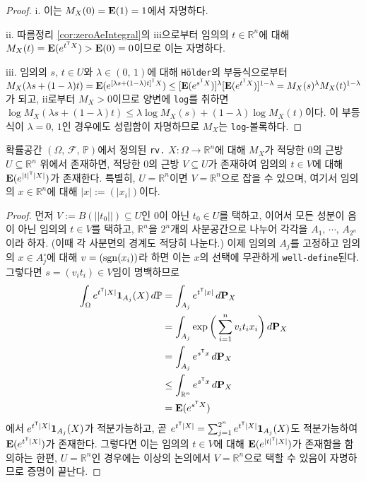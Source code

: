 \begin{proof}
    i. 이는 $M_X(0)=\mathbf{E}(1)=1$에서 자명하다.

    ii. 따름정리 \ref{cor:zeroAeIntegral}의 iii으로부터 임의의 $t\in\mathbb{R}^n$에 대해 $M_X(t)=\mathbf{E}(e^{t^{\mathsf{T}} X})>\mathbf{E}(0)=0$이므로 이는 자명하다.

    iii. 임의의 $s,\,t\in U$와 $\lambda\in(0,\,1)$에 대해 \texttt{H\"older}의 부등식으로부터 $M_X(\lambda s+(1-\lambda)t)=\mathbf{E}(e^{[\lambda s+(1-\lambda)t]^{\mathsf{T}} X})\leq[\mathbf{E}(e^{s^{\mathsf{T}} X})]^\lambda[\mathbf{E}(e^{t^{\mathsf{T}} X})]^{1-\lambda}=M_X(s)^\lambda M_X(t)^{1-\lambda}$가 되고, ii로부터 $M_X>0$이므로 양변에 \texttt{log}를 취하면 $\log M_X(\lambda s+(1-\lambda)t)\leq\lambda\log M_X(s)+(1-\lambda)\log M_X(t)$이다. 이 부등식이 $\lambda=0,\,1$인 경우에도 성립함이 자명하므로 $M_X$는 \texttt{log}-볼록하다.
\end{proof}

\begin{lemma}
    확률공간 $(\Omega,\,\mathcal{F},\,\mathbb{P})$에서 정의된 \texttt{rv.} $X:\Omega\to\mathbb{R}^n$에 대해 $M_X$가 적당한 $0$의 근방 $U\subseteq\mathbb{R}^n$ 위에서 존재하면, 적당한 $0$의 근방 $V\subseteq U$가 존재하여 임의의 $t\in V$에 대해 $\mathbf{E}(e^{|t|^{\mathsf{T}}|X|})$가 존재한다. 특별히, $U=\mathbb{R}^n$이면 $V=\mathbb{R}^n$으로 잡을 수 있으며, 여기서 임의의 $x\in\mathbb{R}^n$에 대해 $|x|:=(|x_i|)$이다.
\end{lemma}

\begin{proof}
    먼저 $V:=B(||t_0||)\subseteq U$인 $0$이 아닌 $t_0\in U$를 택하고, 이어서 모든 성분이 음이 아닌 임의의 $t\in V$를 택하고, $\mathbb{R}^n$을 $2^n$개의 사분공간으로 나누어 각각을 $A_1,\,\cdots,\,A_{2^n}$이라 하자. (이때 각 사분면의 경계도 적당히 나눈다.) 이제 임의의 $A_j$를 고정하고 임의의 $x\in A_j^\circ$에 대해 $v=(\mathrm{sgn}(x_i))$라 하면 이는 $x$의 선택에 무관하게 \texttt{well-define}된다. 그렇다면 $s=(v_it_i)\in V$임이 명백하므로
    \begin{align*}
        \int_\Omega e^{t^{\mathsf{T}}|X|}\mathbf{1}_{A_j}(X)\,d\mathbb{P}&=\int_{A_j}e^{t^{\mathsf{T}}|x|}\,d\mathbf{P}_X\\
        &=\int_{A_j}\exp\bigg(\sum_{i=1}^nv_it_ix_i\bigg)\,d\mathbf{P}_X\\
        &=\int_{A_j}e^{s^{\mathsf{T}} x}\,d\mathbf{P}_X\\
        &\leq\int_{\mathbb{R}^n}e^{s^{\mathsf{T}} x}\,d\mathbf{P}_X\\
        &=\mathbf{E}(e^{s^{\mathsf{T}} X})
    \end{align*}
    에서 $e^{t^{\mathsf{T}}|X|}\mathbf{1}_{A_j}(X)$가 적분가능하고, 곧 $e^{t^{\mathsf{T}}|X|}=\sum_{j=1}^{2^n}e^{t^{\mathsf{T}}|X|}\mathbf{1}_{A_j}(X)$도 적분가능하여 $\mathbf{E}(e^{t^{\mathsf{T}}|X|})$가 존재한다. 그렇다면 이는 임의의 $t\in V$에 대해 $\mathbf{E}(e^{|t|^{\mathsf{T}}|X|})$가 존재함을 함의하는 한편, $U=\mathbb{R}^n$인 경우에는 이상의 논의에서 $V=\mathbb{R}^n$으로 택할 수 있음이 자명하므로 증명이 끝난다.
\end{proof}

